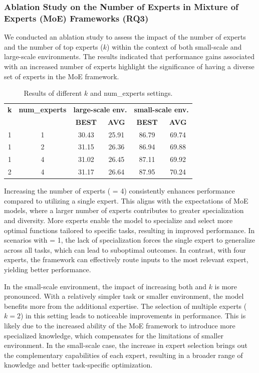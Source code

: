 \documentclass[preprint,12pt]{elsarticle}
\begin{document}
\subsubsection{Ablation Study on the Number of Experts in Mixture of Experts (MoE) Frameworks (RQ3)}
We conducted an ablation study to assess the impact of the number of experts and the number of top experts ($k$) within the context of both small-scale and large-scale environments. The results indicated that performance gains associated with an increased number of experts highlight the significance of having a diverse set of experts in the MoE framework.
\begin{table}[ht]
\centering
\caption{Results of different $k$ and num\_experts settings.}
\begin{tabular}{cc|cc|cc}
\hline
\textbf{k} & \textbf{num\_experts} & \multicolumn{2}{c|}{\textbf{large-scale env.}} & \multicolumn{2}{c}{\textbf{small-scale env.}} \\ 
\cline{3-6}
& & \textbf{BEST} & \textbf{AVG} & \textbf{BEST} & \textbf{AVG} \\ 
\hline
1 & 1 & 30.43 & 25.91 & 86.79 & 69.74 \\ 
1 & 2 & 31.15 & 26.36 & 86.94 & 69.88 \\ 
1 & 4 & 31.02 & 26.45 & 87.11 & 69.92 \\ 
2 & 4 & 31.17 & 26.64 & 87.95 & 70.24 \\ 
\hline
\end{tabular}
\end{table}

Increasing the number of experts ( = 4) consistently enhances performance compared to utilizing a single expert. This aligns with the expectations of MoE models, where a larger number of experts contributes to greater specialization and diversity. More experts enable the model to specialize and select more optimal functions tailored to specific tasks, resulting in improved performance. In scenarios with  = 1, the lack of specialization forces the single expert to generalize across all tasks, which can lead to suboptimal outcomes. In contrast, with four experts, the framework can effectively route inputs to the most relevant expert, yielding better performance.

In the small-scale environment, the impact of increasing both  and $k$ is more pronounced. With a relatively simpler task or smaller environment, the model benefits more from the additional expertise. The selection of multiple experts ($k = 2$) in this setting leads to noticeable improvements in performance. This is likely due to the increased ability of the MoE framework to introduce more specialized knowledge, which compensates for the limitations of smaller environment. In the small-scale case, the increase in expert selection brings out the complementary capabilities of each expert, resulting in a broader range of knowledge and better task-specific optimization.
\end{document}
